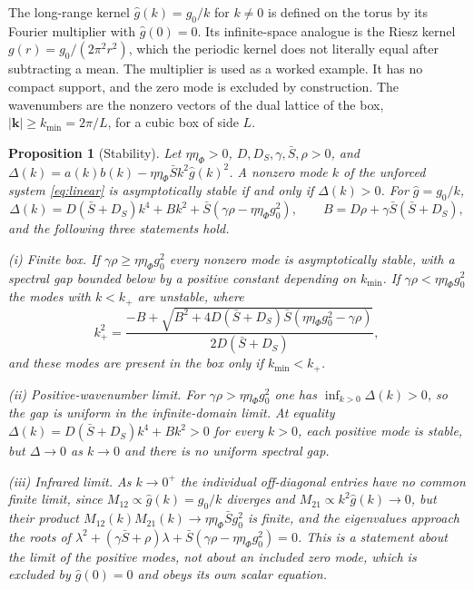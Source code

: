 \documentclass[11pt]{article}
\newtheorem{proposition}{Proposition}[section]
\theoremstyle{definition}
\theoremstyle{remark}
\newcommand{\kk}{\mathbf{k}}
\newcommand{\Sb}{\bar{S}}
\begin{document}
The long-range kernel $\hat g(k)=g_0/k$ for $k\ne0$ is defined on the torus by its Fourier multiplier with $\hat g(0)=0$. Its infinite-space analogue is the Riesz kernel $g(r)=g_0/(2\pi^2r^2)$, which the periodic kernel does not literally equal after subtracting a mean. The multiplier is used as a worked example. It has no compact support, and the zero mode is excluded by construction. The wavenumbers are the nonzero vectors of the dual lattice of the box, $|\kk|\ge k_{\min}=2\pi/L$, for a cubic box of side $L$.

\begin{proposition}[Stability]\label{prop:stab}
Let $\eta\eta_\Phi>0$, $D,D_S,\gamma,\Sb,\rho>0$, and $\Delta(k)=a(k)b(k)-\eta\eta_\Phi\Sb k^2\hat g(k)^2$. A nonzero mode $k$ of the unforced system \eqref{eq:linear} is asymptotically stable if and only if $\Delta(k)>0$. For $\hat g=g_0/k$,
\begin{equation}
\Delta(k)=D(\Sb+D_S)k^4+Bk^2+\Sb\left(\gamma\rho-\eta\eta_\Phi g_0^2\right),\qquad B=D\rho+\gamma\Sb(\Sb+D_S),
\end{equation}
and the following three statements hold.

\noindent(i) Finite box. If $\gamma\rho\ge\eta\eta_\Phi g_0^2$ every nonzero mode is asymptotically stable, with a spectral gap bounded below by a positive constant depending on $k_{\min}$. If $\gamma\rho<\eta\eta_\Phi g_0^2$ the modes with $k<k_+$ are unstable, where
\begin{equation}
k_+^2=\frac{-B+\sqrt{B^2+4D(\Sb+D_S)\Sb(\eta\eta_\Phi g_0^2-\gamma\rho)}}{2D(\Sb+D_S)},
\end{equation}
and these modes are present in the box only if $k_{\min}<k_+$.

\noindent(ii) Positive-wavenumber limit. For $\gamma\rho>\eta\eta_\Phi g_0^2$ one has $\inf_{k>0}\Delta(k)>0$, so the gap is uniform in the infinite-domain limit. At equality $\Delta(k)=D(\Sb+D_S)k^4+Bk^2>0$ for every $k>0$, each positive mode is stable, but $\Delta\to0$ as $k\to0$ and there is no uniform spectral gap.

\noindent(iii) Infrared limit. As $k\to0^+$ the individual off-diagonal entries have no common finite limit, since $M_{12}\propto\hat g(k)=g_0/k$ diverges and $M_{21}\propto k^2\hat g(k)\to0$, but their product $M_{12}(k)M_{21}(k)\to\eta\eta_\Phi\Sb g_0^2$ is finite, and the eigenvalues approach the roots of $\lambda^2+(\gamma\Sb+\rho)\lambda+\Sb(\gamma\rho-\eta\eta_\Phi g_0^2)=0$. This is a statement about the limit of the positive modes, not about an included zero mode, which is excluded by $\hat g(0)=0$ and obeys its own scalar equation.
\end{proposition}
\end{document}
